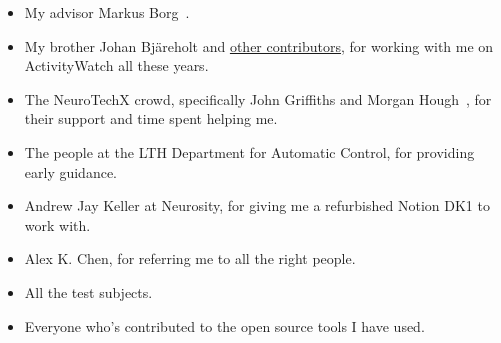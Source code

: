 \begin{itemize}
 \item My advisor Markus Borg~.
 \item My brother Johan Bjäreholt and \href{https://activitywatch.net/contributors/}{other contributors}, for working with me on ActivityWatch all these years.
 \item The NeuroTechX crowd, specifically John Griffiths and Morgan Hough~, for their support and time spent helping me.
 \item The people at the LTH Department for Automatic Control, for providing early guidance.
 \item Andrew Jay Keller at Neurosity, for giving me a refurbished Notion DK1 to work with.
 \item Alex K. Chen, for referring me to all the right people.
 \item All the test subjects.
 \item Everyone who's contributed to the open source tools I have used.
\end{itemize}
